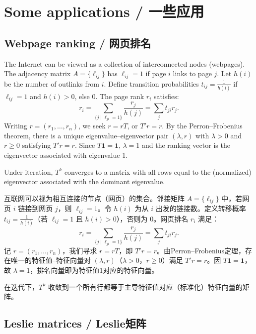 \section{Some applications / 一些应用}

\subsection{Webpage ranking / 网页排名}

\begin{original}
The Internet can be viewed as a collection of interconnected nodes (webpages). The adjacency matrix $A = \{\ell_{ij}\}$ has $\ell_{ij} = 1$ if page $i$ links to page $j$. Let $h(i)$ be the number of outlinks from $i$. Define transition probabilities $t_{ij} = \frac{1}{h(i)}$ if $\ell_{ij} = 1$ and $h(i) > 0$, else 0. The page rank $r_i$ satisfies:
\[
r_i = \sum_{\{j \mid \ell_{ji}=1\}} \frac{r_j}{h(j)} = \sum_j t_{ji} r_j.
\]
Writing $r = (r_1, \dots, r_n)$, we seek $r = rT$, or $T'r = r$. By the Perron--Frobenius theorem, there is a unique eigenvalue--eigenvector pair $(\lambda, r)$ with $\lambda > 0$ and $r \ge 0$ satisfying $T'r = r$. Since $T\mathbf{1} = \mathbf{1}$, $\lambda = 1$ and the ranking vector is the eigenvector associated with eigenvalue 1.

Under iteration, $T^k$ converges to a matrix with all rows equal to the (normalized) eigenvector associated with the dominant eigenvalue.
\end{original}
\begin{translation}
互联网可以视为相互连接的节点（网页）的集合。邻接矩阵 $A = \{\ell_{ij}\}$ 中，若网页 $i$ 链接到网页 $j$，则 $\ell_{ij} = 1$。令 $h(i)$ 为从 $i$ 出发的链接数。定义转移概率 $t_{ij} = \frac{1}{h(i)}$（若 $\ell_{ij} = 1$ 且 $h(i) > 0$），否则为 0。网页排名 $r_i$ 满足：
\[
r_i = \sum_{\{j \mid \ell_{ji}=1\}} \frac{r_j}{h(j)} = \sum_j t_{ji} r_j.
\]
记 $r = (r_1, \dots, r_n)$，我们寻求 $r = rT$，即 $T'r = r$。由Perron--Frobenius定理，存在唯一的特征值--特征向量对 $(\lambda, r)$（$\lambda > 0$，$r \ge 0$）满足 $T'r = r$。因 $T\mathbf{1} = \mathbf{1}$，故 $\lambda = 1$，排名向量即为特征值1对应的特征向量。

在迭代下，$T^k$ 收敛到一个所有行都等于主导特征值对应（标准化）特征向量的矩阵。
\end{translation}

\subsection{Leslie matrices / Leslie矩阵}

